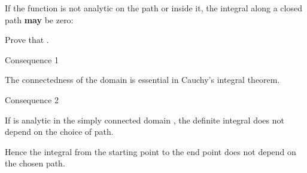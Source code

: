 \begin{EMexample}{}

If the function is not analytic on the path or inside it, the integral along a closed path \textbf{may} be zero:

\end{EMexample}

\begin{EMexercise}{}

Prove that .

\end{EMexercise}

\begin{EMremark}{Consequence 1}

The connectedness of the domain is essential in Cauchy's integral theorem.

\end{EMremark}

\begin{EMremark}{Consequence 2}

If  is analytic in the simply connected domain , the definite integral does not depend on the choice of path.

\end{EMremark}

\begin{EMunit}


\end{EMunit}

\begin{EMunit}

Hence the integral from the starting point to the end point does not depend on the chosen path.


\end{EMunit}

\EMhold


\begin{EMunit}




\end{EMunit}


